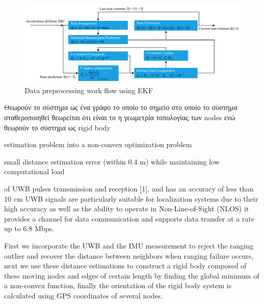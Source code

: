 \begin{figure} [H]
	\centering
	\includegraphics[width=\linewidth]{Images/Related-Work/Data-preprocessing-work-flow-using-EKF.png}
	\decoRule
	\caption[Data preprocessing work flow using EKF]{Data preprocessing work flow using EKF\cite{uwb-imu-gps1}}
	\label{fig:Data-preprocessing-work-flow-using-EKF}
\end{figure}

Θεωρούν το σύστημα ως ένα γράφο το οποίο 
το σημείο στο οποίο το σύστημα σταθεροποιηθεί θεωρείται ότι είναι το η γεωμετρία τοπολογίας των nodes
ενώ θεωρούν το σύστημα ως rigid body 

estimation problem into a non-convex optimization problem



small distance estimation error (within 0.4 m) while maintaining low
computational load

% 

of UWB pulses transmission and reception [1], and has an accuracy of less
than 10 cm UWB signals are particularly suitable for localization systems due to their high
accuracy as well as the ability to operate in Non-Line-of-Sight (NLOS)
it provides a channel for data communication and supports data transfer at a rate up to 6.8
Mbps.

First we
incorporate the UWB and the IMU measurement to reject the ranging outlier and recover the
distance between neighbors when ranging failure occurs, next we use these distance estimations
to construct a rigid body composed of these moving nodes and edges of certain length by finding
the global minimum of a non-convex function, finally the orientation of the rigid body system
is calculated using GPS coordinates of several nodes.


